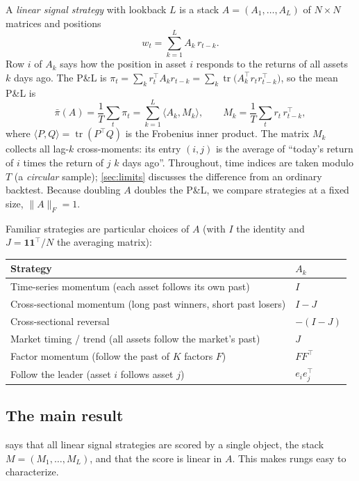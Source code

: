 \documentclass[11pt]{article}
\theoremstyle{definition}
\theoremstyle{remark}
\newcommand{\ip}[2]{\langle #1, #2 \rangle}
\newcommand{\tr}{\operatorname{tr}}
\newcommand{\one}{\mathbf{1}}
\newcommand{\pnl}{\bar{\pi}}
\begin{document}
A \emph{linear signal strategy} with lookback $L$ is a stack $A=(A_1,\dots,A_L)$ of $N\times N$ matrices and positions
\begin{equation}\label{eq:strategy}
  w_t=\sum_{k=1}^{L} A_k\,r_{t-k}.
\end{equation}
Row $i$ of $A_k$ says how the position in asset $i$ responds to the returns of all assets $k$ days ago. The P\&L is
$\pi_t=\sum_k r_t^\top A_k r_{t-k}=\sum_k \tr\!\big(A_k^\top r_t r_{t-k}^\top\big)$, so the mean P\&L is
\begin{equation}\label{eq:pnl}
  \pnl(A)=\frac1T\sum_t \pi_t=\sum_{k=1}^{L}\ip{A_k}{M_k},\qquad
  M_k=\frac1T\sum_{t} r_t\,r_{t-k}^\top,
\end{equation}
where $\ip{P}{Q}=\tr(P^\top Q)$ is the Frobenius inner product. The matrix $M_k$ collects all lag-$k$ cross-moments:
its entry $(i,j)$ is the average of ``today's return of $i$ times the return of $j$ $k$ days ago''.
Throughout, time indices are taken modulo $T$ (a \emph{circular} sample); \cref{sec:limits} discusses the difference from an
ordinary backtest. Because doubling $A$ doubles the P\&L, we compare strategies at a fixed size, $\|A\|_F=1$.

Familiar strategies are particular choices of $A$ (with $I$ the identity and $J=\one\one^\top/N$ the averaging matrix):
\begin{center}
\small
\begin{tabular}{ll}
\toprule
Strategy & $A_k$ \\
\midrule
Time-series momentum (each asset follows its own past) & $I$ \\
Cross-sectional momentum (long past winners, short past losers) & $I-J$ \\
Cross-sectional reversal \citep{lo1990} & $-(I-J)$ \\
Market timing / trend (all assets follow the market's past) & $J$ \\
Factor momentum (follow the past of $K$ factors $F$) & $FF^\top$ \\
Follow the leader (asset $i$ follows asset $j$) & $e_i e_j^\top$ \\
\bottomrule
\end{tabular}
\end{center}

\subsection{The main result}

 says that all linear signal strategies are scored by a single object, the stack $M=(M_1,\dots,M_L)$, and that the score
is linear in $A$. This makes rungs easy to characterize.
\end{document}
